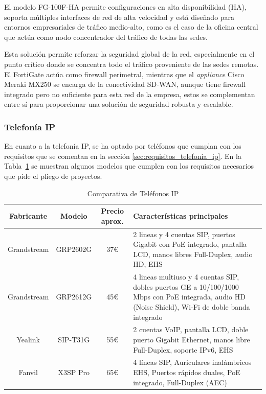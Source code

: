 \vspace{0.5cm}
El modelo FG-100F-HA permite configuraciones en alta disponibilidad (HA), soporta múltiples interfaces de red de alta velocidad y está diseñado para entornos empresariales de tráfico medio-alto, como es el caso de la oficina central que actúa como nodo concentrador del tráfico de todas las sedes.

\vspace{0.5cm}
Esta solución permite reforzar la seguridad global de la red, especialmente en el punto crítico donde se concentra todo el tráfico proveniente de las sedes remotas. El FortiGate actúa como firewall perimetral, mientras que el \textit{appliance} Cisco Meraki MX250 se encarga de la conectividad SD-WAN, aunque tiene firewall integrado pero no suficiente para esta red de la empresa, estos se complementan entre sí para proporcionar una solución de seguridad robusta y escalable.

\subsubsection{Telefonía IP}
En cuanto a la telefonía IP, se ha optado por teléfonos que cumplan con los requisitos que se comentan en la sección \ref{sec:requisitos_telefonia_ip}. En la Tabla~\ref{tab:telefonos_ip} se muestran algunos modelos que cumplen con los requisitos necesarios que pide el pliego de proyectos.
\begin{table}[H]
	\centering
	\small
	\begin{tabular}{|c|c|c|p{6.5cm}|}
		\hline
		\textbf{Fabricante} & \textbf{Modelo} & \textbf{Precio aprox.} & \textbf{Características principales}                                                                                                               \\ \hline
		Grandstream         & GRP2602G        & 37€                    & 2 lineas y 4 cuentas SIP, puertos Gigabit con PoE integrado, pantalla LCD, manos libres Full-Duplex, audio HD, EHS                                 \\ \hline
		Grandstream         & GRP2612G        & 45€                    & 4 lineas multiuso y 4 cuentas SIP, dobles puertos GE a 10/100/1000 Mbps con PoE integrada, audio HD (Noise Shield), Wi-Fi de doble banda integrado \\ \hline
		Yealink             & SIP-T31G        & 55€                    & 2 cuentas VoIP, pantalla LCD, doble puerto Gigabit Ethernet, manos libre Full-Duplex, soporte IPv6, EHS                                            \\ \hline
		Fanvil              & X3SP Pro        & 65€                    & 4 líneas SIP, Auriculares inalámbricos EHS, Puertos rápidos duales, PoE integrado, Full-Duplex (AEC)                                               \\ \hline
	\end{tabular}
	\caption{Comparativa de Teléfonos IP}
	\label{tab:telefonos_ip}
\end{table}

